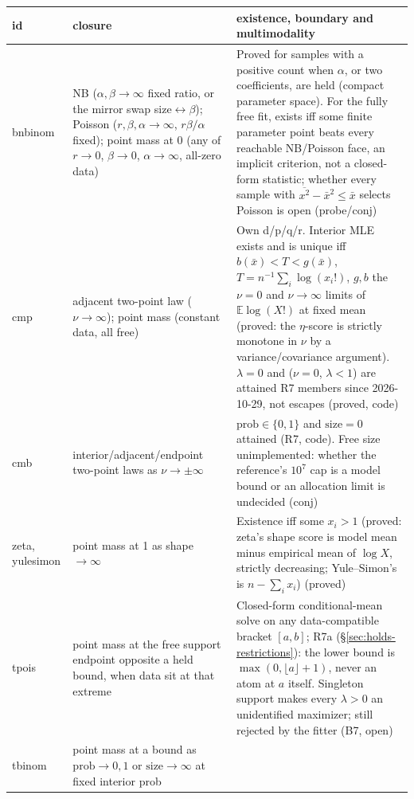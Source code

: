 \documentclass[11pt]{article}
\newcommand{\E}{\mathbb{E}}
\theoremstyle{plain}
\theoremstyle{definition}
\theoremstyle{remark}
\begin{document}
\begin{center}
\small
\begin{tabular}{@{}l p{4.2cm} p{8.2cm}@{}}
\toprule
id & closure & existence, boundary and multimodality \\
\midrule
bnbinom & NB ($\alpha,\beta\to\infty$ fixed ratio, or the mirror swap
  size$\leftrightarrow\beta$); Poisson ($r,\beta,\alpha\to\infty$,
  $r\beta/\alpha$ fixed); point mass at 0 (any of $r\to0$, $\beta\to0$,
  $\alpha\to\infty$, all-zero data) &
  Proved for samples with a positive count when $\alpha$, or two
  coefficients, are held (compact parameter space). For the fully free fit,
  exists iff some finite parameter point beats every reachable NB/Poisson
  face, an implicit criterion, not a closed-form statistic; whether every
  sample with $\overline{x^2}-\bar x^2\le\bar x$ selects Poisson is open
  \cite{irwin1975,xekalaki1984} (probe/conj) \\
cmp & adjacent two-point law ($\nu\to\infty$); point mass (constant data,
  all free) &
  Own d/p/q/r. Interior MLE exists and is unique iff $b(\bar x)<T<g(\bar x)$,
  $T=n^{-1}\sum_i\log(x_i!)$, $g,b$ the $\nu=0$ and $\nu\to\infty$ limits of
  $\E\log(X!)$ at fixed mean (proved: the $\eta$-score is strictly monotone
  in $\nu$ by a variance/covariance argument). $\lambda=0$ and ($\nu=0$,
  $\lambda<1$) are attained R7 members since 2026-10-29, not escapes
  (proved, code) \\
cmb \cite{kadane2016} & interior/adjacent/endpoint two-point laws as
  $\nu\to\pm\infty$ &
  $\mathrm{prob}\in\{0,1\}$ and $\mathrm{size}=0$ attained (R7, code). Free
  size unimplemented: whether the reference's $10^7$ cap is a model bound or
  an allocation limit is undecided (conj) \\
zeta, yulesimon & point mass at 1 as shape $\to\infty$ &
  Existence iff some $x_i>1$ (proved: zeta's shape score is model mean minus
  empirical mean of $\log X$, strictly decreasing; Yule--Simon's is
  $n-\sum_i x_i$) (proved) \\
tpois & point mass at the free support endpoint opposite a held bound, when
  data sit at that extreme &
  Closed-form conditional-mean solve on any data-compatible bracket
  $[a,b]$; R7a (\S\ref{sec:holds-restrictions}): the lower bound is
  $\max(0,\lfloor a\rfloor+1)$, never an atom at $a$ itself. Singleton
  support makes every $\lambda>0$ an unidentified maximizer; still rejected
  by the fitter (B7, open) \\
tbinom & point mass at a bound as $\mathrm{prob}\to0,1$ or
  $\mathrm{size}\to\infty$ at fixed interior prob &

\end{tabular}
\end{center}
\end{document}
